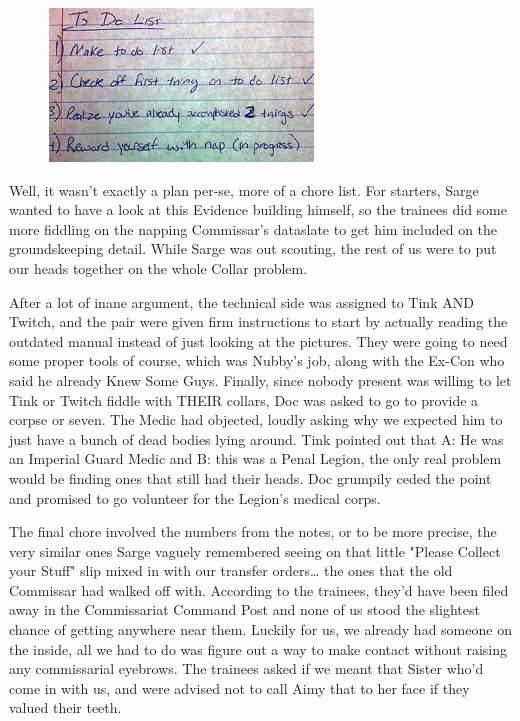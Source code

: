\begin{figure}
	\begin{center}
		\includegraphics[width=\figwidth]{pics/21/17.png}
	\end{center}
\end{figure}
Well, it wasn't exactly a plan per-se, more of a chore list. 
For starters, Sarge wanted to have a look at this Evidence building himself, so the trainees did some more fiddling on the napping Commissar's dataslate to get him included on the groundskeeping detail. 
While Sarge was out scouting, the rest of us were to put our heads together on the whole Collar problem. 


After a lot of inane argument, the technical side was assigned to Tink AND Twitch, and the pair were given firm instructions to start by actually reading the outdated manual instead of just looking at the pictures. 
They were going to need some proper tools of course, which was Nubby's job, along with the Ex-Con who said he already Knew Some Guys. 
Finally, since nobody present was willing to let Tink or Twitch fiddle with THEIR collars, Doc was asked to go to provide a corpse or seven. 
The Medic had objected, loudly asking why we expected him to just have a bunch of dead bodies lying around. 
Tink pointed out that A: 
He was an Imperial Guard Medic and B: 
this was a Penal Legion, the only real problem would be finding ones that still had their heads. 
Doc grumpily ceded the point and promised to go volunteer for the Legion's medical corps.

The final chore involved the numbers from the notes, or to be more precise, the very similar ones Sarge vaguely remembered seeing on that little "Please Collect your Stuff" slip mixed in with our transfer orders… the ones that the old Commissar had walked off with. 
According to the trainees, they'd have been filed away in the Commissariat Command Post and none of us stood the slightest chance of getting anywhere near them. 
Luckily for us, we already had someone on the inside, all we had to do was figure out a way to make contact without raising any commissarial eyebrows. 
The trainees asked if we meant that Sister who'd come in with us, and were advised not to call Aimy that to her face if they valued their teeth.

